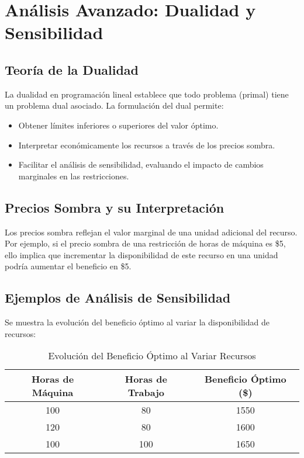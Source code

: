 	\section{Análisis Avanzado: Dualidad y Sensibilidad}
	
	\subsection{Teoría de la Dualidad}
	La dualidad en programación lineal establece que todo problema (primal) tiene un problema dual asociado. La formulación del dual permite:
	\begin{itemize}[noitemsep]
		\item Obtener límites inferiores o superiores del valor óptimo.
		\item Interpretar económicamente los recursos a través de los precios sombra.
		\item Facilitar el análisis de sensibilidad, evaluando el impacto de cambios marginales en las restricciones.
	\end{itemize}
	
	\subsection{Precios Sombra y su Interpretación}
	Los precios sombra reflejan el valor marginal de una unidad adicional del recurso. Por ejemplo, si el precio sombra de una restricción de horas de máquina es \$5, ello implica que incrementar la disponibilidad de este recurso en una unidad podría aumentar el beneficio en \$5.
	
	\subsection{Ejemplos de Análisis de Sensibilidad}
	Se muestra la evolución del beneficio óptimo al variar la disponibilidad de recursos:
	
	\begin{table}[H]
		\centering
		\caption{Evolución del Beneficio Óptimo al Variar Recursos}
		\begin{tabular}{ccc}
			\toprule
			\textbf{Horas de Máquina} & \textbf{Horas de Trabajo} & \textbf{Beneficio Óptimo (\$)} \\
			\midrule
			100 & 80  & 1550 \\
			120 & 80  & 1600 \\
			100 & 100 & 1650 \\
			\bottomrule
		\end{tabular}
	\end{table}
	
